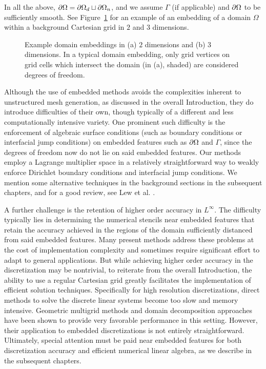 In all the above, $\partial\Omega = \partial\Omega_d \sqcup \partial\Omega_n$, and we assume $\Gamma$ (if applicable) and $\partial\Omega$ to be sufficiently smooth. See Figure~\ref{fig:partII.embedding} for an example of an embedding of a domain $\Omega$ within a background Cartesian grid in $2$ and $3$ dimensions.

\setlength{\figureheight}{0.50\textwidth}
\begin{figure}[htb]
\centering
{}
\caption{Example domain embeddings in (a) $2$ dimensions and (b) $3$ dimensions. In a typical domain embedding, only grid vertices on grid cells which intersect the domain (in (a), shaded) are considered degrees of freedom.}
\label{fig:partII.embedding}
\end{figure}

Although the use of embedded methods avoids the complexities inherent to unstructured mesh generation, as discussed in the overall Introduction, they do introduce difficulties of their own, though typically of a different and less computationally intensive variety. One prominent such difficulty is the enforcement of algebraic surface conditions (such as boundary conditions or interfacial jump conditions) on embedded features such as $\partial\Omega$ and $\Gamma$, since the degrees of freedom now do not lie on said embedded features. Our methods employ a Lagrange multiplier space in a relatively straightforward way to weakly enforce Dirichlet boundary conditions and interfacial jump conditions. We mention some alternative techniques in the background sections in the subsequent chapters, and for a good review, see Lew et al. \cite{Lew.Adrian08}.

A further challenge is the retention of higher order accuracy in $L^{\infty}$. The difficulty typically lies in determining the numerical stencils near embedded features that retain the accuracy achieved in the regions of the domain sufficiently distanced from said embedded features. Many present methods address these problems at the cost of implementation complexity and sometimes require significant effort to adapt to general applications. But while achieving higher order accuracy in the discretization may be nontrivial, to reiterate from the overall Introduction, the ability to use a regular Cartesian grid greatly facilitates the implementation of efficient solution techniques. Specifically for high resolution discretizations, direct methods to solve the discrete linear systems become too slow and memory intensive. Geometric multigrid methods and domain decomposition approaches have been shown to provide very favorable performance in this setting. However, their application to embedded discretizations is not entirely straightforward. Ultimately, special attention must be paid near embedded features for both discretization accuracy and efficient numerical linear algebra, as we describe in the subsequent chapters.

